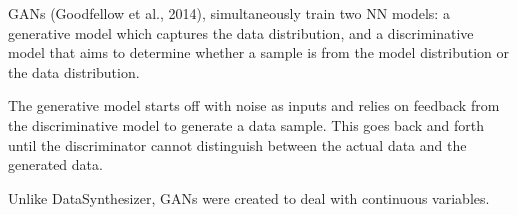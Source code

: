 \documentclass[t,8pt,utfx8]{beamer}
\begin{document}
\begin{spacing}{1.25}
\begin{frame}[c,plain]
GANs (Goodfellow et al., 2014), simultaneously train two NN models: a generative model which captures the data distribution, and a discriminative model that aims to determine whether a sample is from the model distribution or the data distribution. 

The generative model starts off with noise as inputs and relies on feedback from the discriminative model to generate a data sample.  This goes back and forth until the discriminator cannot distinguish between the actual data and the generated data.

Unlike DataSynthesizer, GANs were created to deal with continuous variables.

\end{frame}




\end{spacing}
\end{document}
